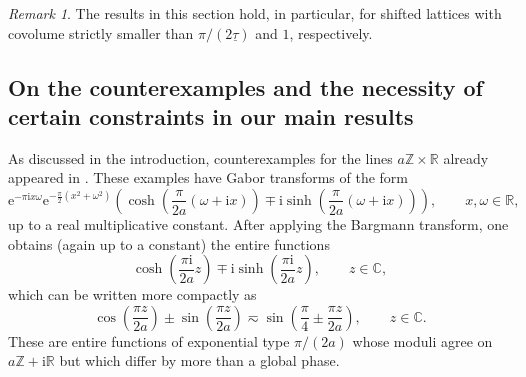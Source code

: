 \documentclass{article}
\newcommand{\bbC}{\mathbb{C}}
\newcommand{\bbR}{\mathbb{R}}
\newcommand{\bbZ}{\mathbb{Z}}
\newcommand{\rme}{\mathrm{e}}
\newcommand{\rmi}{\mathrm{i}}
\theoremstyle{remark}
\newtheorem{remark}{Remark}
\begin{document}
    \begin{remark}
        The results in this section hold, in particular, for shifted lattices with covolume strictly smaller than $\pi/(2\underline \tau)$ and $1$, respectively.
    \end{remark}

    \subsection{On the counterexamples and the necessity of certain constraints in our main results}\label{sec:Counterexamples}

    As discussed in the introduction, counterexamples for the lines $a \bbZ \times \bbR$ already appeared in \cite[cf.~Remark~3 on p.~6]{Alaifari2022Phase}. These examples have Gabor transforms of the form
    \begin{equation*}
        \rme^{-\pi\rmi x\omega} \rme^{-\frac{\pi}{2}\left(x^2 + \omega^2\right)} \left( \cosh\left( \frac{\pi}{2a} \left( \omega + \rmi x \right) \right) \mp \rmi \sinh\left( \frac{\pi}{2a} \left( \omega + \rmi x \right) \right) \right), \qquad x,\omega \in \bbR,
    \end{equation*}
    up to a real multiplicative constant. After applying the Bargmann transform, one obtains (again up to a constant) the entire functions
    \begin{equation*}
        \cosh\left( \frac{\pi \rmi}{2a} z \right) \mp \rmi \sinh\left( \frac{\pi \rmi}{2a} z \right), \qquad z \in \bbC,
    \end{equation*}
    which can be written more compactly as
    \begin{equation*}
        \cos\left( \frac{\pi z}{2a} \right) \pm \sin\left( \frac{\pi z}{2a} \right) \eqsim \sin\left( \frac{\pi}{4} \pm \frac{\pi z}{2a} \right), \qquad z \in \bbC.
    \end{equation*}
    These are entire functions of exponential type $\pi / (2a)$ whose moduli agree on $a \bbZ + \rmi \bbR$ but which differ by more than a global phase.
\end{document}
